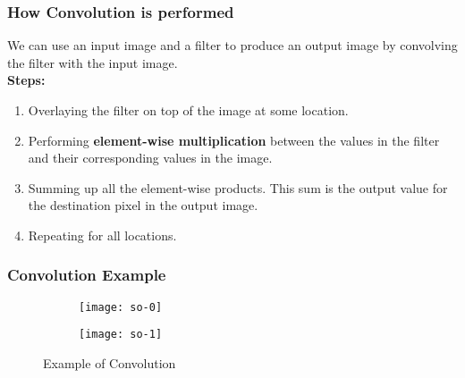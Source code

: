 \documentclass[aspectratio=169, 10pt]{beamer}
\begin{document}
\begin{frame}
	\frametitle{How Convolution is performed}
	We can use an input image and a filter to produce an output image by convolving the filter with the input image.\\
	\vspace{5pt}
	\textbf{Steps:}
	
	\begin{enumerate}
		\item Overlaying the filter on top of the image at some location.
		\item Performing \textbf{element-wise multiplication} between the values in the filter and their corresponding values in the image.
		\item Summing up all the element-wise products. This sum is the output value for the destination pixel in the output image.
		\item Repeating for all locations.
	\end{enumerate}
	
\end{frame}


\begin{frame}

	\frametitle{Convolution Example}
	\begin{figure}[ht]
		\begin{subfigure}{.5\textwidth}
  		\centering
  		\texttt{[image: so-0]}  
  
		\end{subfigure}

		\begin{subfigure}{.5\textwidth}
  		\centering
  		\texttt{[image: so-1]}
		\end{subfigure}
	\caption{Example of Convolution}

\end{figure}
\end{frame}
\end{document}
